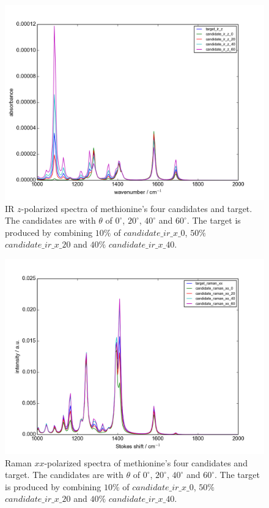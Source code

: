 \begin{figure}[!ht]
\centering
\includegraphics[scale=0.5]{Figures/Met_candidates_plotting_ir_z.png}
\caption{IR $z$-polarized spectra of methionine's four candidates and target. The candidates are with $\theta$ of $0^{\circ}$, $20^{\circ}$, $40^{\circ}$ and $60^{\circ}$. The target is produced by combining $10\%$ of $candidate\_ir\_x\_0$, $50\%$ $candidate\_ir\_x\_20$ and $40\%$ $candidate\_ir\_x\_40$.} \label{fig:2.3}
\end{figure}

\begin{figure}[!ht]
\centering
\includegraphics[scale=0.5]{Figures/Met_candidates_plotting_raman_xx.png}
\caption{Raman $xx$-polarized spectra of methionine's four candidates and target. The candidates are with $\theta$ of $0^{\circ}$, $20^{\circ}$, $40^{\circ}$ and $60^{\circ}$. The target is produced by combining $10\%$ of $candidate\_ir\_x\_0$, $50\%$ $candidate\_ir\_x\_20$ and $40\%$ $candidate\_ir\_x\_40$.} \label{fig:2.4}
\end{figure}

